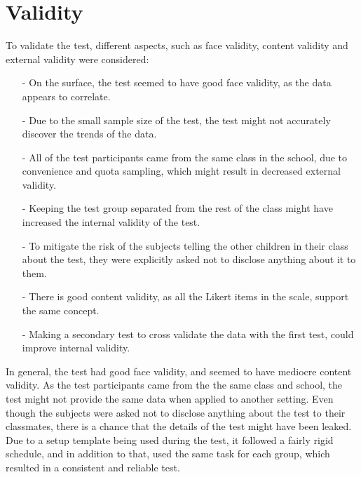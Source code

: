     \section{Validity}
        To validate the test, different aspects, such as face validity, content validity and external validity were  considered:\\
        \begin{itemize}
            \item[-] On the surface, the test seemed to have good face validity, as the data appears to correlate.\\
            \item[-] Due to the small sample size of the test, the test might not accurately discover the trends of the data.\\
            \item[-] All of the test participants came from the same class in the school, due to convenience and quota sampling, which might result in decreased external validity.\\
            \item[-] Keeping the test group separated from the rest of the class might have increased the internal validity of the test.\\
            \item[-] To mitigate the risk of the subjects telling the other children in their class about the test, they were explicitly asked not to disclose anything about it to them.\\
            \item[-] There is good content validity, as all the Likert items in the scale, support the same concept.\\
            \item[-] Making a secondary test to cross validate the data with the first test, could improve internal validity.\\
        \end{itemize}
        
        In general, the test had good face validity, and seemed to have mediocre content validity. As the test participants came from the the same class and school, the test might not provide the same data when applied to another setting. Even though the subjects were asked not to disclose anything about the test to their classmates, there is a chance that the details of the test might have been leaked. Due to a setup template being used during the test, it followed a fairly rigid schedule, and in addition to that, used the same task for each group, which resulted in a consistent and reliable test. 